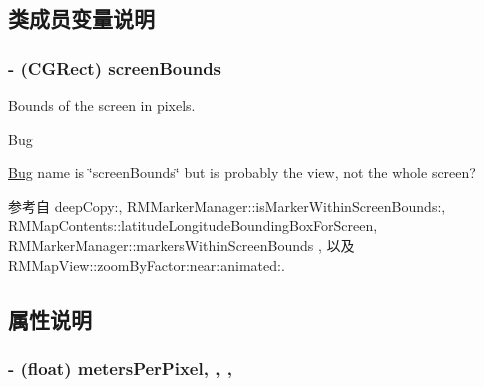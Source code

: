 \subsection{类成员变量说明}
\hypertarget{interface_r_m_mercator_to_screen_projection_ac28d9acefc1c419405f7331d9038675a}{
\subsubsection[{screen\-Bounds}]{\setlength{\rightskip}{0pt plus 5cm}-\/ (C\-G\-Rect) screen\-Bounds\hspace{0.3cm}{\ttfamily [protected]}}}\label{interface_r_m_mercator_to_screen_projection_ac28d9acefc1c419405f7331d9038675a}


Bounds of the screen in pixels. 

\begin{DoxyRefDesc}{Bug}
\item[\hyperlink{bug__bug000032}{Bug}]name is \char`\"{}screen\-Bounds\char`\"{} but is probably the view, not the whole screen? \end{DoxyRefDesc}


参考自 deep\-Copy\-:, R\-M\-Marker\-Manager\-::is\-Marker\-Within\-Screen\-Bounds\-:, R\-M\-Map\-Contents\-::latitude\-Longitude\-Bounding\-Box\-For\-Screen, R\-M\-Marker\-Manager\-::markers\-Within\-Screen\-Bounds , 以及 R\-M\-Map\-View\-::zoom\-By\-Factor\-:near\-:animated\-:.



\subsection{属性说明}
\hypertarget{interface_r_m_mercator_to_screen_projection_a6e73179ce2febd38c2f8baefedfefc47}{
\subsubsection[{meters\-Per\-Pixel}]{\setlength{\rightskip}{0pt plus 5cm}-\/ (float) meters\-Per\-Pixel\hspace{0.3cm}{\ttfamily [read]}, {\ttfamily [write]}, {\ttfamily [atomic]}, {\ttfamily [assign]}}}\label{interface_r_m_mercator_to_screen_projection_a6e73179ce2febd38c2f8baefedfefc47}


